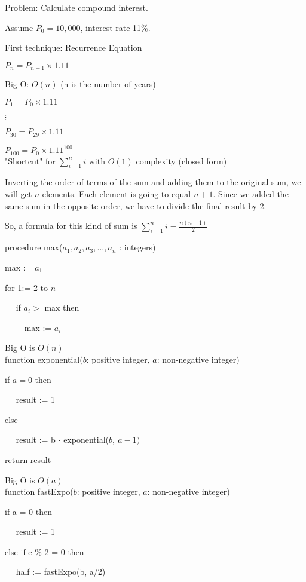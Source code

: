 \documentclass[english,openany]{book}
\begin{document}
	Problem: Calculate compound interest.

    Assume $P_0 = 10,000$, interest rate 11\%.

    First technique: Recurrence Equation

    $P_n = P_{n-1} \times 1.11$

    Big O: $O(n)$ (n is the number of years)

    $P_1 = P_0 \times 1.11$

    $\vdots$

    $P_{30} = P_{29} \times 1.11$

    $P_{100} = P_0 \times 1.11^{100}$\\

    "Shortcut" for $\sum_{i=1}^{n} i$ with $O(1)$ complexity (closed form)

    Inverting the order of terms of the sum and adding them to the original sum, we will get $n$ elements. Each element is going to equal $n+1$. Since we added the same sum in the opposite order, we have to divide the final result by 2.

    So, a formula for this kind of sum is  $\sum_{i=1}^{n} i = \frac{n(n+1)}{2}$

    procedure max($a_1, a_2, a_3, ..., a_n$ : integers)

    max := $a_1$

    for 1:= 2 to $n$

    $\quad$ if $a_i > $ max then

         $\quad\quad$ max := $a_i$

    Big O is $O(n)$\\

    \noindent
    function exponential($b$: positive integer, $a$: non-negative integer)

    if $a = 0$ then

    $\quad$ result := 1

    else

    $\quad$ result := b $\cdot$ exponential($b,\ a-1)$

    return result

    Big O is $O(a)$\\

    \noindent
    function fastExpo($b$: positive integer, $a$: non-negative integer)

    if a = 0 then

    $\quad$ result := 1

    else if e \% 2 = 0 then

    $\quad$ half := fastExpo(b, a/2)
\end{document}
